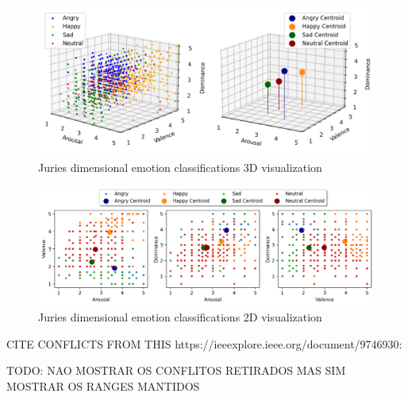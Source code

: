 \begin{figure}[H]
  \centering
  \includegraphics[width=.9\linewidth]{figs/5_data_stratification/primitives_visualization.png}
  \caption{Juries dimensional emotion classifications 3D visualization}
  \label{fig:signalWP}
\end{figure}

\begin{figure}[H]
  \centering
  \includegraphics[width=.9\linewidth]{figs/5_data_stratification/primitives_visualization_2d.png}
  \caption{Juries dimensional emotion classifications 2D visualization}
  \label{fig:signalWP}
\end{figure}


CITE CONFLICTS FROM THIS https://ieeexplore.ieee.org/document/9746930:

TODO: NAO MOSTRAR OS CONFLITOS RETIRADOS MAS SIM MOSTRAR OS RANGES MANTIDOS

